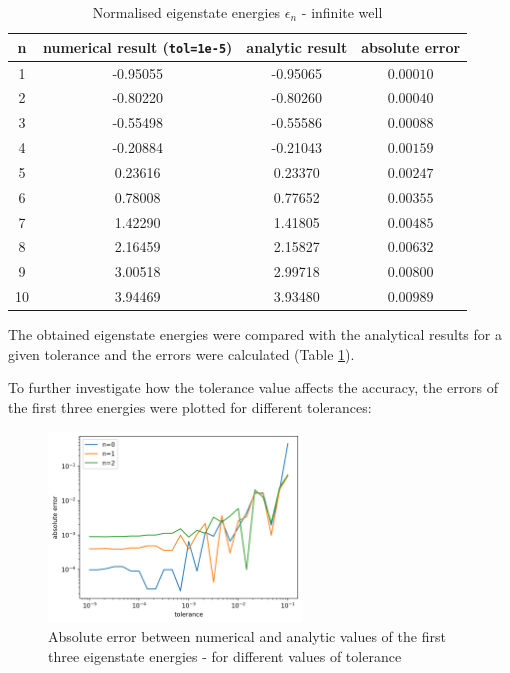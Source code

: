 \documentclass[11pt]{article}
\begin{document}
\begin{table}[h]
  \centering
  \caption{Normalised eigenstate energies $\epsilon_n$ - infinite well}
  \label{tab:1}
  \begin{tabular}{c|c|c|c}
    n & numerical result (\texttt{tol=1e-5}) & analytic result & absolute error\\
    \hline
    1 & -0.95055 & -0.95065 & $0.00010$\\
    2 & -0.80220 & -0.80260 & $0.00040$\\
    3 & -0.55498 & -0.55586 & $0.00088$\\
    4 & -0.20884 & -0.21043 & $0.00159$\\
    5 &  0.23616 &  0.23370 & $0.00247$\\
    6 &  0.78008 &  0.77652 & $0.00355$\\
    7 &  1.42290 &  1.41805 & $0.00485$\\
    8 &  2.16459 &  2.15827 & $0.00632$\\
    9 &  3.00518 &  2.99718 & $0.00800$\\
    10 &  3.94469 &  3.93480 & $0.00989$

  \end{tabular}
\end{table}

The obtained eigenstate energies were compared with the analytical
results for a given tolerance and the errors were calculated
(Table \ref{tab:1}).

To further investigate how the tolerance 
value affects the accuracy, the errors of the first three energies were
plotted for different tolerances:

\begin{figure}[h]
  \centering
  \captionsetup{width=0.6\textwidth}
  \includegraphics*[width=0.6\textwidth]{error_vs_tol.png}
  \caption{Absolute error between numerical and analytic values of the first
  three eigenstate energies - for different values of tolerance}
\end{figure}
\end{document}
